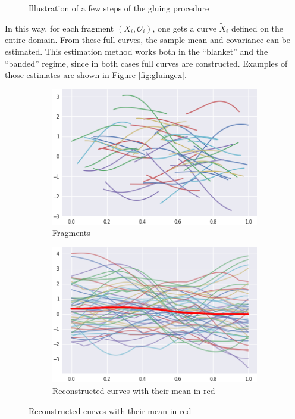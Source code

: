 \documentclass[10pt, a4paper]{report}
\theoremstyle{definition}
\theoremstyle{remark}
\begin{document}
\begin{figure}[htp]
	\caption{Illustration of a few steps of the gluing procedure}
	\label{fig:gluingsteps}
\end{figure}

In this way, for each fragment $(X_i, \mathcal{O}_i)$, one gets a curve $\tilde{X}_i$ defined on the entire domain. From these full curves, the sample mean and covariance can be estimated. This estimation method works both in the ``blanket'' and the ``banded'' regime, since in both cases full curves are constructed. Examples of those estimates are shown in Figure \ref{fig:gluingex}.\\
\begin{figure}[ht]
	\centering
	\begin{subfigure}{.4\textwidth}
		\centering
		\includegraphics[width=.8\linewidth]{Code/images/23/frags}
		\caption{Fragments}
	\end{subfigure}%
	\begin{subfigure}{.4\textwidth}
		\centering
		\includegraphics[width=.8\linewidth]{Code/images/23/extended}
		\caption{\centering Reconstructed curves with their mean in red}
	\end{subfigure}
	
	
	\medskip
	

\end{figure}
\end{document}
